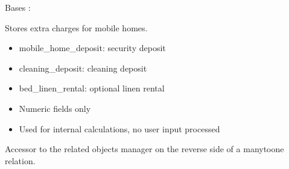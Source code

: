 \documentclass[letterpaper,10pt,french]{sphinxmanual}
\begin{document}

\begin{fulllineitems}
\label{\detokenize{index:bookings.models.SupplementMobileHome}}
\pysigstartsignatures
\pysiglinewithargsret
{}
{\sphinxparamcomma {}}
{}
\pysigstopsignatures
\sphinxAtStartPar
Bases : 

\sphinxAtStartPar
Stores extra charges for mobile homes.
\begin{description}
\begin{itemize}
\item {} 
\sphinxAtStartPar
mobile\_home\_deposit: security deposit

\item {} 
\sphinxAtStartPar
cleaning\_deposit: cleaning deposit

\item {} 
\sphinxAtStartPar
bed\_linen\_rental: optional linen rental

\end{itemize}

\begin{itemize}
\item {} 
\sphinxAtStartPar
Numeric fields only

\item {} 
\sphinxAtStartPar
Used for internal calculations, no user input processed

\end{itemize}

\end{description}

\begin{fulllineitems}
\label{\detokenize{index:bookings.models.SupplementMobileHome.translations}}
\pysigstartsignatures
\pysigline
{}
\pysigstopsignatures
\sphinxAtStartPar
Accessor to the related objects manager on the reverse side of a
many\sphinxhyphen{}to\sphinxhyphen{}one relation.


\end{fulllineitems}
\end{fulllineitems}
\end{document}
